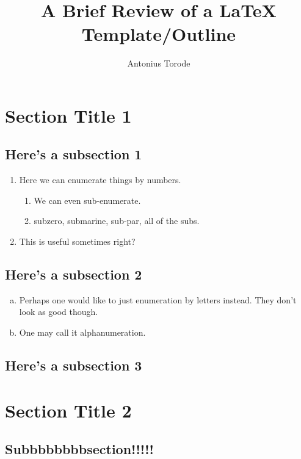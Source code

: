 \documentclass[11pt]{article}
\title{A Brief Review of a LaTeX Template/Outline}
\author{Antonius Torode}
\begin{document}
\maketitle
\thispagestyle{fancy}

\section{Section Title 1}

\subsection{Here's a subsection 1}

\begin{enumerate}
	\item Here we can enumerate things by numbers.
	\begin{enumerate}
		\item We can even sub-enumerate.
		\item subzero, submarine, sub-par, all of the subs.
	\end{enumerate}
	\item This is useful sometimes right?
\end{enumerate}

\subsection{Here's a subsection 2}

\begin{enumerate}[(a)]
	\item Perhaps one would like to just enumeration by letters instead. They don't look as good though.
	\item One may call it alphanumeration.
\end{enumerate}

\subsection{Here's a subsection 3}

\section{Section Title 2}

\subsection{Subbbbbbbbsection!!!!!}
\end{document}

